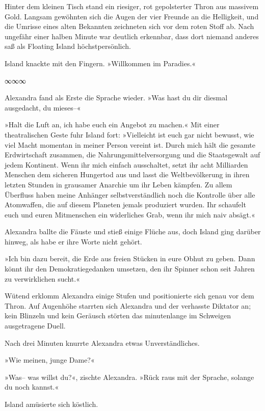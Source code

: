 Hinter dem kleinen Tisch stand ein riesiger, rot gepolsterter Thron aus massivem Gold. Langsam gewöhnten sich die Augen der vier Freunde an die Helligkeit, und die Umrisse eines alten Bekannten zeichneten sich vor dem roten Stoff ab. Nach ungefähr einer halben Minute war deutlich erkennbar, dass dort niemand anderes saß als Floating Island höchstpersönlich.

Island knackte mit den Fingern. »Willkommen im Paradies.«

\begin{center}
∞∞∞
\end{center}

Alexandra fand als Erste die Sprache wieder. »Was hast du dir diesmal ausgedacht, du mieses–«

»Halt die Luft an, ich habe euch ein Angebot zu machen.« Mit einer theatralischen Geste fuhr Island fort: »Vielleicht ist euch gar nicht bewusst, wie viel Macht momentan in meiner Person vereint ist. Durch mich hält die gesamte Erdwirtschaft zusammen, die Nahrungsmittelversorgung und die Staatsgewalt auf jedem Kontinent. Wenn ihr mich einfach ausschaltet, setzt ihr acht Milliarden Menschen dem sicheren Hungertod aus und lasst die Weltbevölkerung in ihren letzten Stunden in grausamer Anarchie um ihr Leben kämpfen. Zu allem Überfluss haben meine Anhänger selbstverständlich noch die Kontrolle über alle Atomwaffen, die auf diesem Planeten jemals produziert wurden. Ihr schaufelt euch und euren Mitmenschen ein widerliches Grab, wenn ihr mich naiv absägt.«

Alexandra ballte die Fäuste und stieß einige Flüche aus, doch Island ging darüber hinweg, als habe er ihre Worte nicht gehört.

»Ich bin dazu bereit, die Erde aus freien Stücken in eure Obhut zu geben. Dann könnt ihr den Demokratiegedanken umsetzen, den ihr Spinner schon seit Jahren zu verwirklichen sucht.«

Wütend erklomm Alexandra einige Stufen und positionierte sich genau vor dem Thron. Auf Augenhöhe starrten sich Alexandra und der verhasste Diktator an; kein Blinzeln und kein Geräusch störten das minutenlange im Schweigen ausgetragene Duell.

Nach drei Minuten knurrte Alexandra etwas Unverständliches.

»Wie meinen, junge Dame?«

»Was– was willst du?«, zischte Alexandra. »Rück raus mit der Sprache, solange du noch kannst.«

Island amüsierte sich köstlich.


